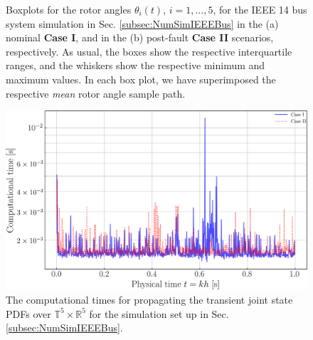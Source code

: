 \documentclass[10pt,twocolumn]{IEEEtran}
\begin{document}
\begin{figure}[ht!]
   \hspace{\fill}
\caption{\small{Boxplots for the rotor angles $\theta_{i}(t)$, $i=1,\hdots,5$, for the IEEE 14 bus system simulation in Sec. \ref{subsec:NumSimIEEEBus} in the (a) nominal \textbf{Case I}, and in the (b) post-fault \textbf{Case II} scenarios, respectively. As usual, the boxes show the respective interquartile ranges, and the whiskers show the respective minimum and maximum values. In each box plot, we have superimposed  the respective \emph{mean} rotor angle sample path.}}
\vspace*{-0.1in}
\label{fig:IEEE14theta}
\end{figure}





\begin{figure}[htpb]
\centering
\includegraphics[width=0.95\linewidth]{ComputationalTimeSyntheticIEEE14busCase1and2combined.png}
\caption{\small{The computational times for propagating the transient joint state PDFs over $\mathbb{T}^{5}\times\mathbb{R}^{5}$ for the simulation set up in Sec. \ref{subsec:NumSimIEEEBus}.}}
\vspace*{-0.1in}
\label{fig:CompTimeIEEE14bus}
\end{figure}
\end{document}
